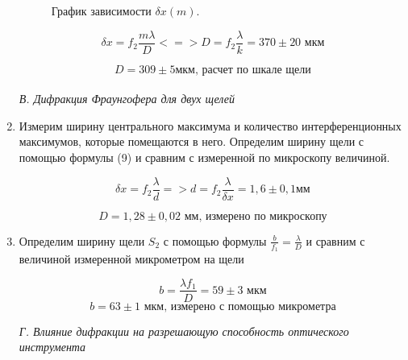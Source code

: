 \documentclass[a4paper, 12pt]{article}%
\begin{document}
\begin{enumerate}
	 \begin{figure}[H]
	 	\caption{График зависимости $\delta x (m)$.}
	 \end{figure}
	 
	$$ \delta x = f_2 \frac{m\lambda}{D} <=> D = f_2 \frac{\lambda}{k} = 370 \pm 20\text{ мкм} $$
	
	
	$$ D = 309 \pm 5 \text{мкм, расчет по шкале щели} $$\\
	
	
	\textit{В. Дифракция Фраунгофера для двух щелей}\\
	
	\item Измерим ширину центрального максимума и количество интерференционных максимумов, которые помещаются в него. Определим ширину щели с помощью формулы (9) и сравним с измеренной по микроскопу величиной.
	
	$$ \delta x = f_2 \frac{\lambda}{d} => d = f_2 \frac{\lambda}{\delta x}  = 1,6 \pm 0,1 \text{мм}$$
	
	$$ D = 1,28 \pm 0,02 \text{ мм, измерено по микроскопу} $$
	
	\item Определим ширину щели $S_2$ с помощью формулы $ \frac{b}{f_1} = \frac{\lambda}{D}$ и сравним с величиной измеренной микрометром на щели
	
	$$ b = \frac{\lambda f_1}{D} = 59 \pm 3 \text{ мкм}$$
	$$ b = 63 \pm 1 \text{ мкм, измерено с помощью микрометра}$$
	
	
	\textit{Г. Влияние дифракции на разрешающую способность оптического инструмента}\\
	

\end{enumerate}
\end{document}
